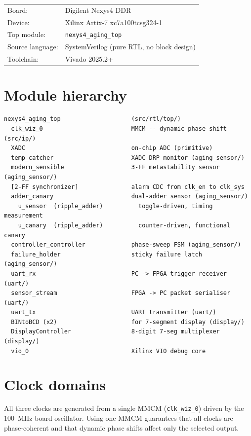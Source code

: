 \documentclass[12pt, a4paper]{report}
\begin{document}
\begin{tabular}{ll}
  Board: & Digilent Nexys4 DDR \\
  Device: & Xilinx Artix-7 xc7a100tcsg324-1 \\
  Top module: & \texttt{nexys4\_aging\_top} \\
  Source language: & SystemVerilog (pure RTL, no block design) \\
  Toolchain: & Vivado 2025.2+ \\
\end{tabular}

\section{Module hierarchy}

\begin{lstlisting}[style=shell, caption={RTL module hierarchy}]
nexys4_aging_top                    (src/rtl/top/)
  clk_wiz_0                         MMCM -- dynamic phase shift (src/ip/)
  XADC                              on-chip ADC (primitive)
  temp_catcher                      XADC DRP monitor (aging_sensor/)
  modern_sensible                   3-FF metastability sensor (aging_sensor/)
  [2-FF synchronizer]               alarm CDC from clk_en to clk_sys
  adder_canary                      dual-adder sensor (aging_sensor/)
    u_sensor  (ripple_adder)          toggle-driven, timing measurement
    u_canary  (ripple_adder)          counter-driven, functional canary
  controller_controller             phase-sweep FSM (aging_sensor/)
  failure_holder                    sticky failure latch (aging_sensor/)
  uart_rx                           PC -> FPGA trigger receiver (uart/)
  sensor_stream                     FPGA -> PC packet serialiser (uart/)
  uart_tx                           UART transmitter (uart/)
  BINtoBCD (x2)                     for 7-segment display (display/)
  DisplayController                 8-digit 7-seg multiplexer (display/)
  vio_0                             Xilinx VIO debug core
\end{lstlisting}

\section{Clock domains}

All three clocks are generated from a single MMCM (\texttt{clk\_wiz\_0}) driven by
the 100~MHz board oscillator. Using one MMCM guarantees that all clocks are
phase-coherent and that dynamic phase shifts affect only the selected output.
\end{document}
